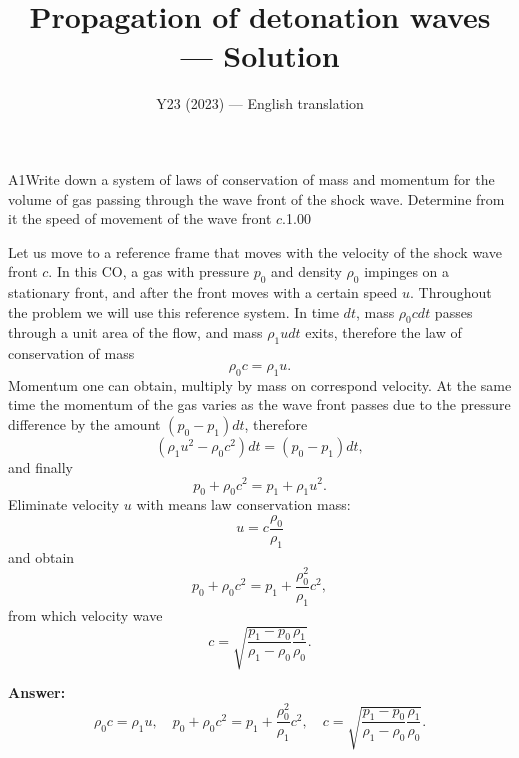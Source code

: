 \documentclass[11pt,a4paper]{article}
\title{\textbf{Propagation of detonation waves --- Solution}}
\author{\normalsize Y23 (2023) — English translation}
\date{}
\begin{document}
\maketitle\vspace{-0.5em}
\begin{solcard}{A1}{Write down a system of laws of conservation of mass and momentum for the volume of gas passing through the wave front of the shock wave. Determine from it the speed of movement of the wave front $c$.}{1.00}

Let us move to a reference frame that moves with the velocity of the shock wave front $c$. In this CO, a gas with pressure $p_0$ and density $\rho_0$ impinges on a stationary front, and after the front moves with a certain speed $u$. Throughout the problem we will use this reference system. In time $dt$, mass $\rho_0  c dt$ passes through a unit area of the flow, and mass $\rho_1 u dt$ exits, therefore the law of conservation of mass $$ \rho_0 c = \rho_1 u. $$Momentum one can obtain, multiply by mass on correspond velocity. At the same time the momentum of the gas varies as the wave front passes due to the pressure difference by the amount $(p_0 - p_1) dt$, therefore $$ (\rho_1 u^2 - \rho_0 c^2 )dt = (p_0 - p_1 )dt, $$and finally $$ p_0 + \rho_0 c^2 = p_1 + \rho_1 u^2. $$Eliminate velocity $u$ with means law conservation mass: $$ u = c \frac{\rho_0}{\rho_1} $$and obtain $$ p_0 + \rho_0 c^2 = p_1 + \frac{\rho_0^2}{\rho_1} c^2, $$from which velocity wave $$ c = \sqrt{\frac{p_1 - p_0}{\rho_1 - \rho_0} \frac{\rho_1}{\rho_0}}. $$

\par\smallskip\noindent\textbf{Answer:} $$ \rho_0 c = \rho_1 u, \quad p_0 + \rho_0 c^2 = p_1 + \frac{\rho_0^2}{\rho_1} c^2, \quad c = \sqrt{\frac{p_1 - p_0}{\rho_1 - \rho_0} \frac{\rho_1}{\rho_0}}. $$
\end{solcard}
\end{document}
